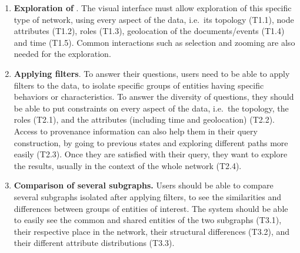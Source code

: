 \begin{enumerate}
    \item \textbf{Exploration of \model}. The visual interface must allow exploration of this specific type of network, using every aspect of the data, i.e.\ its topology (T1.1), node attributes  (T1.2), roles (T1.3), geolocation of the documents/events (T1.4) and time (T1.5).
    Common interactions such as selection and zooming are also needed for the exploration.
    \item \textbf{Applying filters}. To answer their questions, users need to be able to apply filters to the data, to isolate specific groups of entities having specific behaviors or characteristics. To answer the diversity of questions, they should be able to put constraints on every aspect of the data, i.e.\ the topology, the roles (T2.1), and the attributes (including time and geolocation) (T2.2).
    Access to provenance information can also help them in their query construction, by going to previous states and exploring different paths more easily (T2.3). Once they are satisfied with their query, they want to explore the results, usually in the context of the whole network (T2.4).
    \item \textbf{Comparison of several subgraphs.} Users should be able to compare several subgraphs isolated after applying filters, to see the similarities and differences between groups of entities of interest. The system should be able to easily see the common and shared entities of the two subgraphs (T3.1), their respective place in the network, their structural differences (T3.2), and their different attribute distributions (T3.3).
\end{enumerate}


